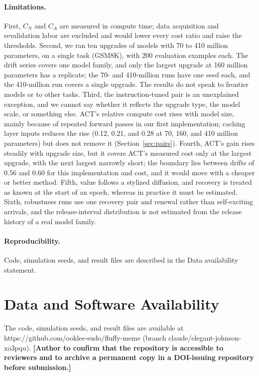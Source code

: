 \documentclass[ijoc,nonblindrev]{informs4}
\begin{document}
\paragraph{Limitations.} First, $C_N$ and $C_A$ are measured in compute time; data acquisition and revalidation labor
are excluded and would lower every cost ratio and raise the thresholds. Second, we ran ten upgrades of models with 70 to 410 million parameters, on a single task (GSM8K), with 200 evaluation examples each. The drift series covers one model family, and only the largest upgrade at 160 million parameters has a replicate; the 70- and 410-million runs have one seed each, and the 410-million run covers a single upgrade. The results do not speak to frontier models or to other tasks.
Third, the instruction-tuned pair is an unexplained exception, and we cannot say whether it reflects the upgrade type, the model scale, or something else. ACT's relative compute cost rises with model size, mainly because of repeated forward passes in our first implementation; caching layer inputs reduces the rise (0.12, 0.21, and 0.28 at 70, 160, and 410 million parameters) but does not remove it (Section~\ref{sec:pairs}). Fourth, ACT's gain rises steadily with upgrade size, but it covers ACT's measured cost only at the largest upgrade, with the next largest narrowly short; the boundary lies between drifts of 0.56 and 0.60 for this implementation and cost, and it would move with a cheaper or better method. Fifth, value follows a stylized diffusion, and recovery is treated as known at the start of an epoch, whereas in
practice it must be estimated. Sixth, robustness runs use one recovery pair and renewal rather than self-exciting arrivals, and the release-interval distribution is not estimated from the release history of a real model family.

\paragraph{Reproducibility.} Code, simulation seeds, and result files are described in the Data availability statement.


\section*{Data and Software Availability}
The code, simulation seeds, and result files are available at https://github.com/ooklee-sudo/fluffy-meme (branch claude/elegant-johnson-xo3pqu). \textbf{[Author to confirm that the repository is accessible to reviewers and to archive a permanent copy in a DOI-issuing repository before submission.]}
\end{document}
